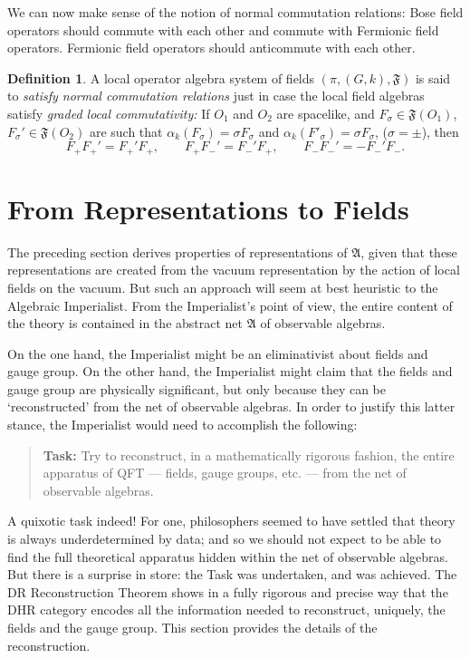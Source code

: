 \documentclass[12pt]{article}
\newenvironment{bxd}%
  {\bigskip\noindent\begin{Sbox}\begin{minipage}{0.9\textwidth} }%
  {\end{minipage}\end{Sbox}\fbox{\TheSbox}\bigskip}%
\newcommand{\alg}[1]{\mathfrak{#1}}
\theoremstyle{definition}
\theoremstyle{definition}
\newtheorem{defn}[thm]{Definition}
\theoremstyle{remark}
\def\al#1{{\mathfrak #1}}
\newcommand{\Rep}{\mathrm{Rep}}
\begin{document}
We can now make sense of the notion of normal commutation relations:
Bose field operators should commute with each other and commute with
Fermionic field operators.  Fermionic field operators should
anticommute with each other.

\begin{bxd}
  \begin{defn} \label{normal-commutation} A local operator algebra
    system of fields $(\pi ,(G,k),\alg{F})$ is said to \emph{satisfy
      normal commutation relations} just in case the local field
    algebras satisfy \emph{graded local commutativity:} If $O_1$ and
    $O_2$ are spacelike, and $F_\sigma\in \alg{F}(O_1)$,
    $F_{\sigma}'\in \alg{F}(O_2)$ are such that $\alpha
    _k(F_{\sigma})=\sigma F_{\sigma}$ and $\alpha
    _k(F'_{\sigma})=\sigma F_{\sigma}$, ($\sigma =\pm$), then
    \[ F_+F_+'=F_+'F_+,\qquad F_+F_-'=F_-'F_+,\qquad F_-F_-'=-F_-'F_- .\]
\end{defn}
\end{bxd}



\section{From Representations to Fields} \label{sec-DR}

The preceding section derives properties of
representations of $\al A$, given that these
representations are created from the vacuum
representation by the action of local fields on the
vacuum.  But such an approach will seem at best
heuristic to the Algebraic Imperialist.  From the
Imperialist's point of view, the entire content of the
theory is contained in the abstract net $\al A$ of
observable algebras.  

On the one hand, the Imperialist might be an eliminativist about
fields and gauge group.  On the other hand, the Imperialist might
claim that the fields and gauge group are physically significant, but
only because they can be `reconstructed' from the net of observable
algebras.  In order to justify this latter stance, the Imperialist
would need to accomplish the following:
\begin{quote} \textbf{Task:} Try to reconstruct, in a
  mathematically rigorous fashion, the entire apparatus
  of QFT --- fields, gauge groups, etc. --- from the
  net of observable algebras.
\end{quote}
A quixotic task indeed! For one, philosophers seemed to
have settled that theory is always underdetermined by
data; and so we should not expect to be able to find
the full theoretical apparatus hidden within the net of
observable algebras.  But there is a surprise in store:
the Task was undertaken, and was achieved.  The DR
Reconstruction Theorem shows in a fully rigorous and
precise way that the DHR category encodes all the
information needed to reconstruct, uniquely, the fields
and the gauge group.  This section provides the details
of the reconstruction.
\end{document}
